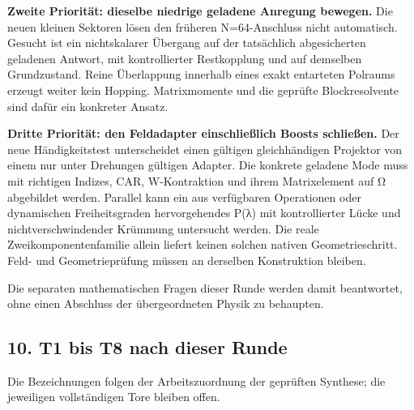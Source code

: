 \textbf{Zweite Priorität: dieselbe niedrige geladene Anregung bewegen.}
Die neuen kleinen Sektoren lösen den früheren N=64-Anschluss nicht
automatisch. Gesucht ist ein nichtskalarer Übergang auf der tatsächlich
abgesicherten geladenen Antwort, mit kontrollierter Restkopplung und auf
demselben Grundzustand. Reine Überlappung innerhalb eines exakt
entarteten Polraums erzeugt weiter kein Hopping. Matrixmomente und die
geprüfte Blockresolvente sind dafür ein konkreter Ansatz.

\textbf{Dritte Priorität: den Feldadapter einschließlich Boosts
schließen.} Der neue Händigkeitstest unterscheidet einen gültigen
gleichhändigen Projektor von einem nur unter Drehungen gültigen Adapter.
Die konkrete geladene Mode muss mit richtigen Indizes, CAR,
W-Kontraktion und ihrem Matrixelement auf Ω abgebildet werden. Parallel
kann ein aus verfügbaren Operationen oder dynamischen Freiheitsgraden
hervorgehendes P(λ) mit kontrollierter Lücke und nichtverschwindender
Krümmung untersucht werden. Die reale Zweikomponentenfamilie allein
liefert keinen solchen nativen Geometrieschritt. Feld- und
Geometrieprüfung müssen an derselben Konstruktion bleiben.

Die separaten mathematischen Fragen dieser Runde werden damit
beantwortet, ohne einen Abschluss der übergeordneten Physik zu
behaupten.

\subsection{10. T1 bis T8 nach dieser
Runde}\label{t1-bis-t8-nach-dieser-runde}

Die Bezeichnungen folgen der Arbeitszuordnung der geprüften Synthese;
die jeweiligen vollständigen Tore bleiben offen.

